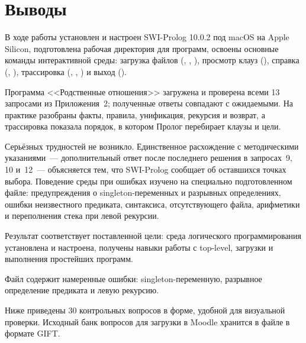 \documentclass[14pt,a4paper]{extarticle}
\begin{document}
\section{Выводы}

В ходе работы установлен и настроен SWI-Prolog 10.0.2 под macOS на Apple Silicon, подготовлена рабочая директория для программ, освоены основные команды интерактивной среды: загрузка файлов (, \code{[file]}, ), просмотр клауз (), справка (, ), трассировка (, , ) и выход ().

Программа <<Родственные отношения>> загружена и проверена всеми 13 запросами из Приложения~2; полученные ответы совпадают с ожидаемыми. На практике разобраны факты, правила, унификация, рекурсия и возврат, а трассировка показала порядок, в котором Пролог перебирает клаузы и цели.

Серьёзных трудностей не возникло. Единственное расхождение с методическими указаниями~--- дополнительный ответ  после последнего решения в запросах~9, 10 и~12~--- объясняется тем, что SWI-Prolog сообщает об оставшихся точках выбора. Поведение среды при ошибках изучено на специально подготовленном файле: предупреждения о singleton-переменных и разрывных определениях, ошибки неизвестного предиката, синтаксиса, отсутствующего файла, арифметики и переполнения стека при левой рекурсии.

Результат соответствует поставленной цели: среда логического программирования установлена и настроена, получены навыки работы с top-level, загрузки и выполнения простейших программ.

\newpage
{}

Файл  содержит намеренные ошибки: singleton-переменную, разрывное определение предиката и левую рекурсию.



Ниже приведены 30 контрольных вопросов в форме, удобной для визуальной проверки. Исходный банк вопросов для загрузки в Moodle хранится в файле  в формате GIFT.


\end{document}
